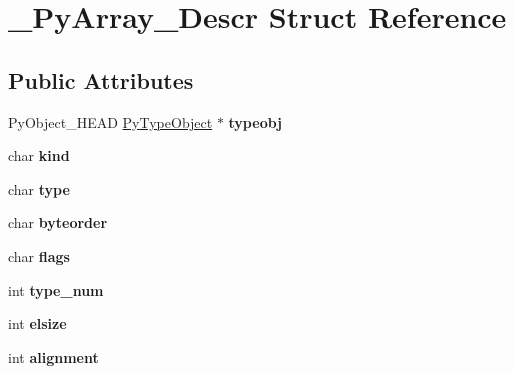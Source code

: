 \hypertarget{struct__PyArray__Descr}{}\section{\+\_\+\+Py\+Array\+\_\+\+Descr Struct Reference}
\label{struct__PyArray__Descr}
\subsection*{Public Attributes}
\begin{DoxyCompactItemize}
\item 
Py\+Object\+\_\+\+H\+E\+AD \hyperlink{struct__typeobject}{Py\+Type\+Object} $\ast$ {\bfseries typeobj}\hypertarget{struct__PyArray__Descr_aee629ea11190a98a116ea92f09af00aa}{}\label{struct__PyArray__Descr_aee629ea11190a98a116ea92f09af00aa}

\item 
char {\bfseries kind}\hypertarget{struct__PyArray__Descr_a3334dbcd62c0b82b746d78df163f5fe8}{}\label{struct__PyArray__Descr_a3334dbcd62c0b82b746d78df163f5fe8}

\item 
char {\bfseries type}\hypertarget{struct__PyArray__Descr_a7fee62e125b41e0fdb9dec616ea724d4}{}\label{struct__PyArray__Descr_a7fee62e125b41e0fdb9dec616ea724d4}

\item 
char {\bfseries byteorder}\hypertarget{struct__PyArray__Descr_a928bedd6abfdb662cc486eb459de8743}{}\label{struct__PyArray__Descr_a928bedd6abfdb662cc486eb459de8743}

\item 
char {\bfseries flags}\hypertarget{struct__PyArray__Descr_a42b75d020f1e81c1e55aa784d922bb6c}{}\label{struct__PyArray__Descr_a42b75d020f1e81c1e55aa784d922bb6c}

\item 
int {\bfseries type\+\_\+num}\hypertarget{struct__PyArray__Descr_a8c77d1daf95cdb46a52b374e614d1e77}{}\label{struct__PyArray__Descr_a8c77d1daf95cdb46a52b374e614d1e77}

\item 
int {\bfseries elsize}\hypertarget{struct__PyArray__Descr_a9426578c59c17b7dde397bc1d12110c8}{}\label{struct__PyArray__Descr_a9426578c59c17b7dde397bc1d12110c8}

\item 
int {\bfseries alignment}\hypertarget{struct__PyArray__Descr_a6395d1390bf5a63c117b2bd5bf11e6d6}{}\label{struct__PyArray__Descr_a6395d1390bf5a63c117b2bd5bf11e6d6}


\end{DoxyCompactItemize}
